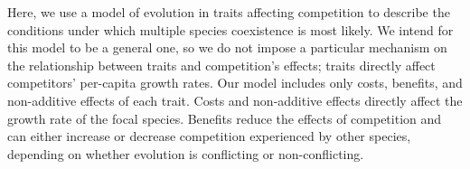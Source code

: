 Here, we use a model of evolution in traits affecting competition to describe
the conditions under which multiple species coexistence is most likely.
We intend for this model to be a general one, so we do not impose a particular 
mechanism on the relationship between traits and competition’s effects;
traits directly affect competitors' per-capita growth rates.
Our model includes only costs, benefits, and non-additive effects of each trait. 
Costs and non-additive effects directly affect the growth rate of the focal species.
Benefits reduce the effects of competition and can either increase or decrease 
competition experienced by other species, depending
on whether evolution is conflicting or non-conflicting.


